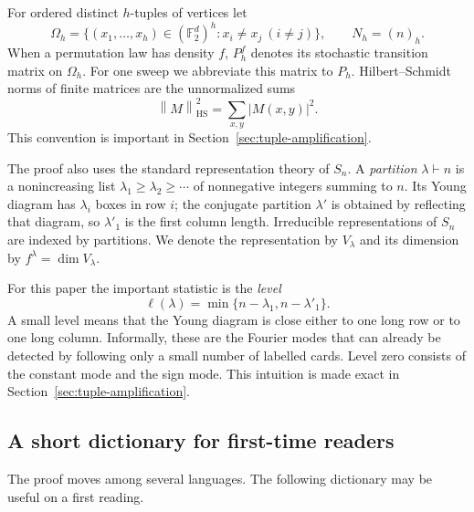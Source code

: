 \documentclass[11pt]{article}
\numberwithin{equation}{section}
\theoremstyle{definition}\newtheorem{definition}[theorem]{Definition}
\theoremstyle{remark}\newtheorem{remark}[theorem]{Remark}
\newcommand{\HS}{\mathrm{HS}}
\newcommand{\norm}[1]{\left\lVert#1\right\rVert}
\newcommand{\Ftwo}{\mathbb F_2}
\begin{document}
For ordered distinct $h$-tuples of vertices let
\[
 \Omega_h=\{(x_1,\ldots,x_h)\in(\Ftwo^d)^h:x_i\ne x_j\ (i\ne j)\},
 \qquad N_h=(n)_h.
\]
When a permutation law has density $f$, $P_h^f$ denotes its stochastic
transition matrix on $\Omega_h$.  For one sweep we abbreviate this matrix to
$P_h$.  Hilbert--Schmidt norms of finite matrices are the unnormalized sums
\[
 \norm M_{\HS}^2=\sum_{x,y}|M(x,y)|^2.
\]
This convention is important in Section~\ref{sec:tuple-amplification}.

The proof also uses the standard representation theory of $S_n$.  A
\emph{partition} $\lambda\vdash n$ is a nonincreasing list
$\lambda_1\ge\lambda_2\ge\cdots$ of nonnegative integers summing to $n$.
Its Young diagram has $\lambda_i$ boxes in row $i$; the conjugate partition
$\lambda'$ is obtained by reflecting that diagram, so $\lambda'_1$ is the
first column length.  Irreducible representations of $S_n$ are indexed by
partitions.  We denote the representation by $V_\lambda$ and its dimension by
$f^\lambda=\dim V_\lambda$.

For this paper the important statistic is the \emph{level}
\begin{equation}\label{eq:level-intro}
 \ell(\lambda)=\min\{n-\lambda_1,n-\lambda'_1\}.
\end{equation}
A small level means that the Young diagram is close either to one long row or
to one long column.  Informally, these are the Fourier modes that can already
be detected by following only a small number of labelled cards.  Level zero
consists of the constant mode and the sign mode.  This intuition is made exact
in Section~\ref{sec:tuple-amplification}.

\subsection{A short dictionary for first-time readers}
The proof moves among several languages.  The following dictionary may be
useful on a first reading.
\end{document}
